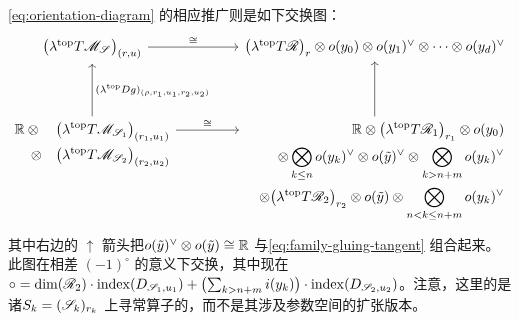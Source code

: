 \eqref{eq:orientation-diagram} 的相应推广则是如下交换图：
\begin{equation}\label{eq:family-gluing-diagram}
\begin{tikzcd}[column sep=4.5em,row sep=3.8em]
\bigl(\lambda^{\mathrm{top}}T\scr{M}_{\scr{S}}\bigr)_{(r,u)}
\ar[r,"\cong"]
&
\bigl(\lambda^{\mathrm{top}}T\scr{R}\bigr)_r\otimes o(y_0)\otimes o(y_1)^{\vee}\otimes\cdots\otimes o(y_d)^{\vee}
\\
{\begin{aligned}[t]
\RR\otimes{}&\bigl(\lambda^{\mathrm{top}}T\scr{M}_{\scr{S}_1}\bigr)_{(r_1,u_1)}\\
\otimes{}&\bigl(\lambda^{\mathrm{top}}T\scr{M}_{\scr{S}_2}\bigr)_{(r_2,u_2)}
\end{aligned}}
\ar[u,"(\lambda^{\mathrm{top}}Dg)_{(\rho,r_1,u_1,r_2,u_2)}"']
\ar[r,"\cong"]
&
{\begin{aligned}[t]
&\RR\otimes\bigl(\lambda^{\mathrm{top}}T\scr{R}_1\bigr)_{r_1}\otimes o(y_0)\\
&\otimes\bigotimes_{k\le n}o(y_k)^{\vee}\otimes o(\tilde{y})^{\vee}\otimes\bigotimes_{k>n+m}o(y_k)^{\vee}\\
&\otimes\bigl(\lambda^{\mathrm{top}}T\scr{R}_2\bigr)_{r_2}\otimes o(\tilde{y})\otimes\bigotimes_{n<k\le n+m}o(y_k)^{\vee}
\end{aligned}}
\ar[u]
\end{tikzcd}
\end{equation}
其中右边的 $\uparrow$ 箭头把\trPairing{}$o(\tilde{y})^{\vee}\otimes o(\tilde{y})\cong\mathbb{R}$ 与\eqref{eq:family-gluing-tangent} 组合起来。此图在相差 $(-1)^{\circ}$ 的意义下交换，其中现在 $\circ=\dim(\mathscr{R}_2)\cdot\mathrm{index}(D_{\mathscr{S}_1,u_1})+\bigl(\sum_{k>n+m}i(y_k)\bigr)\cdot\mathrm{index}(D_{\mathscr{S}_2,u_2})$。注意，这里的\trIndex{}是诸\trSurface{}$S_k=(\mathscr{S}_k)_{r_k}$ 上寻常\trLinearization{}算子的\trIndex，而不是其涉及参数空间的扩张版本。
